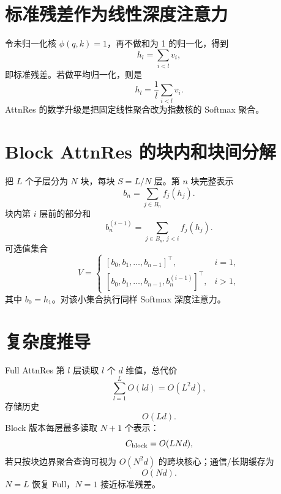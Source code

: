 \documentclass[UTF8,12pt,a4paper,fontset=none]{ctexart}
\numberwithin{equation}{section}
\begin{document}
\section{标准残差作为线性深度注意力}
令未归一化核 $\phi(q,k)=1$，再不做和为 1 的归一化，得到
\begin{equation}
 h_l=\sum_{i<l}v_i,
\end{equation}
即标准残差。若做平均归一化，则是
\begin{equation}
 h_l=\frac1l\sum_{i<l}v_i.
\end{equation}
AttnRes 的数学升级是把固定线性聚合改为指数核的 Softmax 聚合。

\section{Block AttnRes 的块内和块间分解}
把 $L$ 个子层分为 $N$ 块，每块 $S=L/N$ 层。第 $n$ 块完整表示
\begin{equation}
 b_n=\sum_{j\in B_n}f_j(h_j).
\end{equation}
块内第 $i$ 层前的部分和
\begin{equation}
 b_n^{(i-1)}=\sum_{j\in B_n,\,j<i}f_j(h_j).
\end{equation}
可选值集合
\begin{equation}
 V=\begin{cases}
 [b_0,b_1,\ldots,b_{n-1}]^\top,&i=1,\\
 [b_0,b_1,\ldots,b_{n-1},b_n^{(i-1)}]^\top,&i>1,
 \end{cases}
\end{equation}
其中 $b_0=h_1$。对该小集合执行同样 Softmax 深度注意力。

\section{复杂度推导}
Full AttnRes 第 $l$ 层读取 $l$ 个 $d$ 维值，总代价
\begin{equation}
 \sum_{l=1}^{L}O(ld)=O(L^2d),
\end{equation}
存储历史
\begin{equation}
 O(Ld).
\end{equation}
Block 版本每层最多读取 $N+1$ 个表示：
\begin{equation}
 C_{\rm block}=O(LNd),
\end{equation}
若只按块边界聚合查询可视为 $O(N^2d)$ 的跨块核心；通信/长期缓存为
\begin{equation}
 O(Nd).
\end{equation}
$N=L$ 恢复 Full，$N=1$ 接近标准残差。
\end{document}
